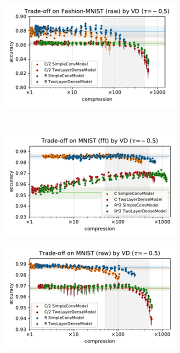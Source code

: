 \documentclass[a4paper,10pt,onecolumn]{article}
\begin{document}
\begin{figure}[b]
\begin{subfigure}[b]{0.5\columnwidth}
  \end{subfigure}%
  \begin{subfigure}[b]{0.5\columnwidth}
    \centering
    \includegraphics[width=\columnwidth]{figure__mnist-like__trade-off/appendix__cmp__VD__fashionmnist__raw__-0.5.pdf}
  \end{subfigure} \\ %
  \begin{subfigure}[b]{0.5\columnwidth}
    \centering
    \includegraphics[width=\columnwidth]{figure__mnist-like__trade-off/appendix__cmp__VD__mnist__fft__-0.5.pdf}
  \end{subfigure}%
  \begin{subfigure}[b]{0.5\columnwidth}
    \centering
    \includegraphics[width=\columnwidth]{figure__mnist-like__trade-off/appendix__cmp__VD__mnist__raw__-0.5.pdf}

\end{subfigure}
\end{figure}
\end{document}
